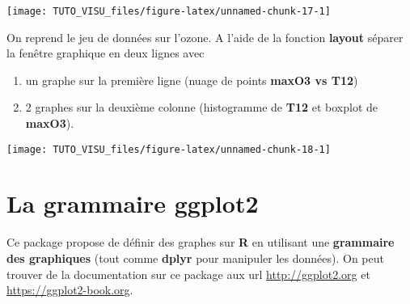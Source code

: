 \documentclass[]{book}
\newenvironment{Shaded}{\begin{snugshade}}{\end{snugshade}}
\newcommand{\DataTypeTok}[1]{\textcolor[rgb]{0.13,0.29,0.53}{#1}}
\newcommand{\DecValTok}[1]{\textcolor[rgb]{0.00,0.00,0.81}{#1}}
\newcommand{\KeywordTok}[1]{\textcolor[rgb]{0.13,0.29,0.53}{\textbf{#1}}}
\newcommand{\NormalTok}[1]{#1}
\newcommand{\OperatorTok}[1]{\textcolor[rgb]{0.81,0.36,0.00}{\textbf{#1}}}
\newcommand{\OtherTok}[1]{\textcolor[rgb]{0.56,0.35,0.01}{#1}}
\newcommand{\StringTok}[1]{\textcolor[rgb]{0.31,0.60,0.02}{#1}}
\providecommand{\tightlist}{%
  \setlength{\itemsep}{0pt}\setlength{\parskip}{0pt}}
\theoremstyle{definition}
\theoremstyle{definition}
\theoremstyle{definition}
\theoremstyle{remark}
\let\BeginKnitrBlock\begin \let\EndKnitrBlock\end
\begin{document}
\begin{center}\texttt{[image: TUTO\_VISU\_files/figure-latex/unnamed-chunk-17-1]} \end{center}

\BeginKnitrBlock{exercise}[Layout]
\protect\hypertarget{exr:exo4}{}{\label{exr:exo4} \iffalse (Layout) \fi{} }On reprend le jeu de données sur l'ozone. A l'aide de la fonction \textbf{layout} séparer la fenêtre graphique en deux lignes avec
\EndKnitrBlock{exercise}

\begin{enumerate}
\def\labelenumi{\arabic{enumi}.}
\tightlist
\item
  un graphe sur la première ligne (nuage de points \textbf{maxO3 vs T12})
\item
  2 graphes sur la deuxième colonne (histogramme de \textbf{T12} et boxplot de \textbf{maxO3}).
\end{enumerate}

\begin{Shaded}
\end{Shaded}

\begin{center}\texttt{[image: TUTO\_VISU\_files/figure-latex/unnamed-chunk-18-1]} \end{center}

\hypertarget{la-grammaire-ggplot2}{%
\section{\texorpdfstring{La grammaire \textbf{ggplot2}}{La grammaire ggplot2}}\label{la-grammaire-ggplot2}}

Ce package propose de définir des graphes sur \textbf{R} en utilisant une \textbf{grammaire des graphiques} (tout comme \textbf{dplyr} pour manipuler les données). On peut trouver de la documentation sur ce package aux url \url{http://ggplot2.org} et \url{https://ggplot2-book.org}.
\end{document}
